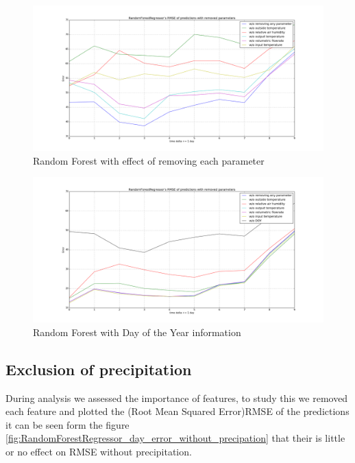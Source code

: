 \documentclass{scrartcl}
\begin{document}
\begin{figure}[H]
  \center
  \includegraphics[width=1\linewidth]{img/RandomForestRegressor_day_error_without_some_params.png}
  \caption{Random Forest with effect of removing each parameter}
  \label{fig:RandomForestRegressor_day_error_without_some_params}
\end{figure}

\begin{figure}[H]
  \center
  \includegraphics[width=1\linewidth]{img/RandomForestRegressor_day_error_without_some_params_DOY.png}
  \caption{Random Forest with Day of the Year information}
  \label{fig:RandomForestRegressor_day_error_without_some_params_DOY}
\end{figure}


\subsection{Exclusion of precipitation}	
During analysis we assessed the importance of features, to study this we removed each feature and plotted the (Root Mean Squared Error)RMSE of the predictions it can be seen form the figure \ref{fig:RandomForestRegressor_day_error_without_precipation} that their is little or no effect on RMSE without precipitation.
\end{document}
